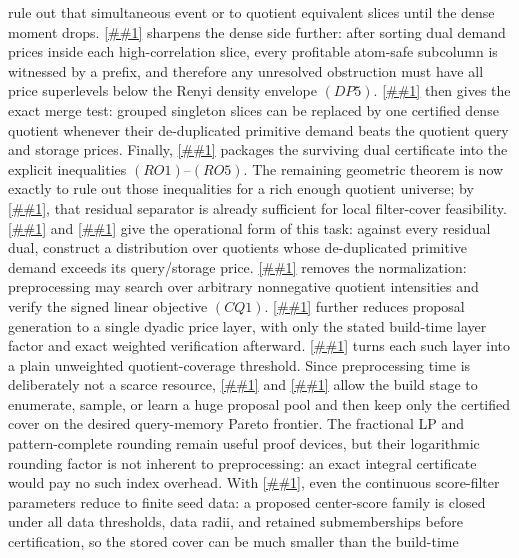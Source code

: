 \documentclass[10pt]{article}
\newcommand{\cref}[1]{\ref{##1}}
\newcommand{\Cref}[1]{\ref{##1}}
\theoremstyle{definition}
\begin{document}
rule out that simultaneous event or to quotient equivalent slices until the
dense moment drops.  \Cref{lem:dense-slice-prefix-separation} sharpens the dense
side further: after sorting dual demand prices inside each high-correlation
slice, every profitable atom-safe subcolumn is witnessed by a prefix, and
therefore any unresolved obstruction must have all price superlevels below the
Renyi density envelope \((DP5)\).  \Cref{lem:dense-slice-quotient-separation}
then gives the exact merge test: grouped singleton slices can be replaced by one
certified dense quotient whenever their de-duplicated primitive demand beats the
quotient query and storage prices.  Finally,
\cref{cor:residual-dense-cover-obstruction} packages the surviving dual
certificate into the explicit inequalities \((RO1)\)--\((RO5)\).  The remaining
geometric theorem is now exactly to rule out those inequalities for a rich enough
quotient universe; by \cref{cor:residual-separator-local-cover}, that residual
separator is already sufficient for local filter-cover feasibility.
\Cref{lem:quotient-packing-reduced-gain} and
\cref{cor:quotient-packing-local-cover} give the operational form of this task:
against every residual dual, construct a distribution over quotients whose
de-duplicated primitive demand exceeds its query/storage price.
\Cref{cor:conic-quotient-packing} removes the normalization: preprocessing may
search over arbitrary nonnegative quotient intensities and verify the signed
linear objective \((CQ1)\).  \Cref{lem:dyadic-quotient-packing} further reduces
proposal generation to a single dyadic price layer, with only the stated
build-time layer factor and exact weighted verification afterward.
\Cref{cor:unweighted-quotient-coverage-screen} turns each such layer into a
plain unweighted quotient-coverage threshold.  Since
preprocessing time is deliberately not a scarce resource,
\cref{lem:finite-pool-optimizer} and
\cref{cor:offline-pareto-compression} allow the build stage to enumerate,
sample, or learn a huge proposal pool and then keep only the certified cover on
the desired query-memory Pareto frontier.  The fractional LP and
pattern-complete rounding remain useful proof devices, but their logarithmic
rounding factor is not inherent to preprocessing: an exact integral certificate
would pay no such index overhead.  With
\cref{cor:offline-center-score-saturation}, even the continuous score-filter
parameters reduce to finite seed data: a proposed center-score family is closed
under all data thresholds, data radii, and retained submemberships before
certification, so the stored cover can be much smaller than the build-time
\end{document}
